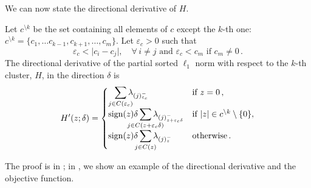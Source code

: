 
We can now state the directional derivative of $H$. %

\begin{theorem}\label{thm:sl1-directional-derivative}
  Let \(c^{\setminus k}\) be the set containing all elements of $c$ except the $k$-th one: $c^{\setminus k} =  \{c_1, \ldots c_{k-1}, c_{k+1}, \ldots, c_m \}$.
  Let $\varepsilon_c > 0$ such that
  \begin{equation}
    \label{eq:epsilon-c}
    \varepsilon_c < \big| c_i - c_j\big| , \quad \forall\, i \neq j \text{ and } \varepsilon_c < c_m \text{ if } c_m \neq 0 \, .
  \end{equation}
  The directional derivative of the partial sorted $\ell_1$ norm with respect to the $k$-th cluster, \(H\), in the direction \(\delta\) is
  \[
    H'(z; \delta) =
    \begin{cases}
      \smashoperator[r]{\sum_{j \in C(\varepsilon_c )}} \lambda_{(j)^-_{\varepsilon_c }}
       & \text{if } z = 0 \, ,               \\
      \sign(z)\delta\smashoperator{\sum_{j \in C(z + {\varepsilon_c} \delta)}} \lambda_{(j)^-_{z + {\varepsilon_c}\delta}}
       & \text{if } |z| \in c^{\setminus k} \setminus \{0\} , \\
      \sign(z)\delta\smashoperator{\sum_{j \in C(z)}} \lambda_{(j)^-_{z}}
       & \text{otherwise} \, .
    \end{cases}
  \]
\end{theorem}
The proof is in ; in , we show an example of the directional
derivative and the objective function.

